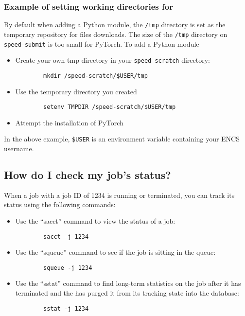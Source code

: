 \subsubsection{Example of setting working directories for }

By default when adding a Python module, the \texttt{/tmp} directory is set as the temporary repository for files downloads.
The size of the \texttt{/tmp} directory on \verb!speed-submit! is too small for PyTorch.
To add a Python module
\begin{itemize}
    \item Create your own tmp directory in your \verb!speed-scratch! directory:
	\begin{verbatim} 
  		mkdir /speed-scratch/$USER/tmp
	\end{verbatim}
	\item Use the temporary directory you created
	\begin{verbatim} 
  		setenv TMPDIR /speed-scratch/$USER/tmp
	\end{verbatim}
    \item Attempt the installation of PyTorch
\end{itemize}
\noindent In the above example, \verb!$USER! is an environment variable containing your ENCS username.

\subsection{How do I check my job's status?}

When a job with a job ID of 1234 is running or terminated, 
you can track its status using the following commands:
\begin{itemize}
	\item Use the ``sacct'' command to view the status of a job:
	\begin{verbatim} 
		sacct -j 1234
	\end{verbatim}
	\item Use the ``squeue'' command to see if the job is sitting in the queue:
	\begin{verbatim} 
		squeue -j 1234
	\end{verbatim}
	\item Use the ``sstat'' command to find long-term statistics on the job after it has terminated 
	and the  has purged it from its tracking state into the database:
	\begin{verbatim} 
		sstat -j 1234
	\end{verbatim}
\end{itemize}

